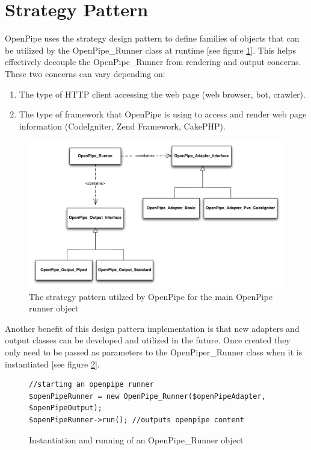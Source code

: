 \documentclass[12pt]{report}
\begin{document}
\section{Strategy Pattern}
OpenPipe uses the strategy design pattern to define families of objects that can be utilized by the OpenPipe\_Runner class at runtime [see figure \ref{fig:strategyRunner}]. This helps effectively decouple the OpenPipe\_Runner from rendering and output concerns. These two concerns can vary depending on:

\begin{enumerate}
	\item The type of HTTP client accessing the web page (web browser, bot, crawler).
	\item The type of framework that OpenPipe is using to access and render web page information (CodeIgniter, Zend Framework, CakePHP).
\end{enumerate}

\begin{figure}[H]
\label{fig:strategyRunner}
\centering
\includegraphics[width=\textwidth,keepaspectratio]{figures/images/strategy_runner.pdf}
\caption{The strategy pattern utilzed by OpenPipe for the main OpenPipe runner object}
\end{figure}

Another benefit of this design pattern implementation is that new adapters and output classes can be developed and utilized in the future. Once created they only need to be passed as parameters to the OpenPiper\_Runner class when it is instantiated [see figure \ref{fig:strategyRunnerCode}].

\begin{figure}[H]
\label{fig:strategyRunnerCode}
\begin{lstlisting}
//starting an openpipe runner
$openPipeRunner = new OpenPipe_Runner($openPipeAdapter, $openPipeOutput); 
$openPipeRunner->run(); //outputs openpipe content
\end{lstlisting}
\caption{Instantiation and running of an OpenPipe\_Runner object}
\end{figure}
\end{document}
